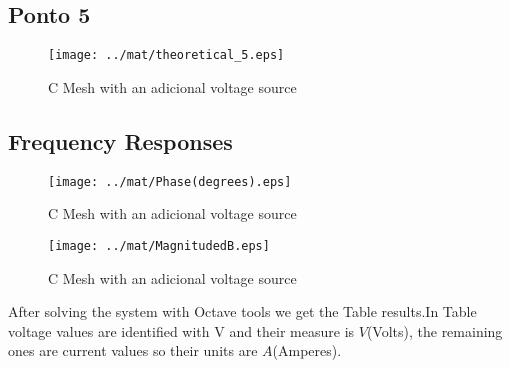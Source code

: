 \subsection{Ponto 5}

\begin{figure}[H] \centering
\texttt{[image: ../mat/theoretical\_5.eps]}
\caption{C Mesh with an adicional voltage source} %
\label{fig:mat4}
\end{figure}


\subsection{Frequency Responses}

\begin{figure}[H] \centering
\texttt{[image: ../mat/Phase(degrees).eps]}
\caption{C Mesh with an adicional voltage source} %
\label{fig:mat5db}
\end{figure}

\begin{figure}[H] \centering
\texttt{[image: ../mat/MagnitudedB.eps]}
\caption{C Mesh with an adicional voltage source} %
\label{fig:mat5ps}
\end{figure}



After solving the system with Octave tools we get the Table results.In Table voltage values are identified with V and their measure is $V$(Volts), the remaining ones are current values so their units are $A$(Amperes).





